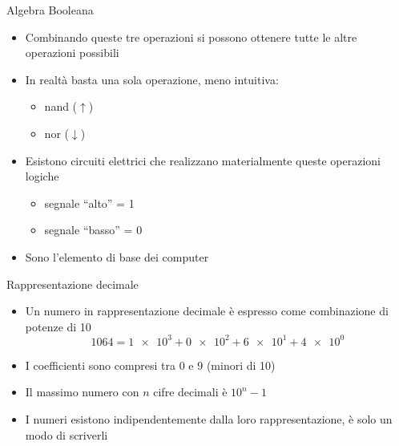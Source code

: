 \begin{frame}{Algebra Booleana}
  \vfill
  \begin{itemize}
    \item Combinando queste tre operazioni si possono ottenere tutte le altre
    operazioni possibili
    \vfill
    \item In realtà basta \alert{una} sola operazione, meno intuitiva:
    \begin{itemize}
      \item nand (\(\uparrow\))
      \item nor (\(\downarrow\))
    \end{itemize}
    \vfill
    \item Esistono circuiti \alert{elettrici} che realizzano materialmente queste
    operazioni logiche
    \begin{itemize}
      \item segnale ``alto'' = 1
      \item segnale ``basso'' = 0
    \end{itemize}
    \vfill
    \item Sono l'elemento di base dei computer
  \end{itemize}
  \vfill
\end{frame}

\begin{frame}{Rappresentazione decimale}
  \vfill
  \begin{itemize}
    \item Un numero in rappresentazione \alert{decimale} è espresso come combinazione
    di potenze di 10
    \[\num{1064} = \num{1e3} + \num{0e2} + \num{6e1} + \num{4e0}\]
    \item I coefficienti sono compresi tra 0 e 9 (\alert{minori} di 10)
    \vfill
    \item Il massimo numero con \(n\) cifre decimali è \(10^n - 1\)
    \vfill
    \item I numeri esistono indipendentemente dalla loro rappresentazione, è solo
    un modo di scriverli
  \end{itemize}
  \vfill
\end{frame}

